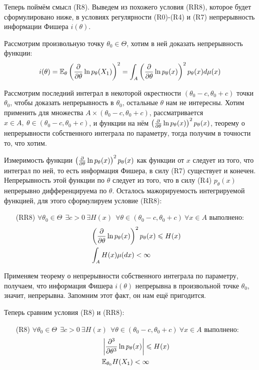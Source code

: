 \begin{note}
    Теперь поймём смысл (R8). Выведем из похожего условия (RR8), которое будет сформулировано ниже, в условиях регулярности (R0)-(R4) и (R7) непрерывность информации Фишера $i(\theta)$.
    
    Рассмотрим произвольную точку $\theta_0 \in \Theta$, хотим в ней доказать непрерывность функции:
    \[
        i(\theta) = \mathbb{E}_\theta \left(\frac{\partial}{\partial \theta} \ln p_\theta(X_1)\right)^2 = \int_A \left(\frac{\partial}{\partial \theta} \ln p_\theta(x)\right)^2 p_\theta(x) d\mu(x)
    \]

    Рассмотрим последний интеграл в некоторой окрестности $(\theta_0 - c, \theta_0 + c)$ точки $\theta_0$, чтобы доказать непрерывность в $\theta_0$, остальные $\theta$ нам не интересны. Хотим применить для множества $A \times (\theta_0 - c, \theta_0 + c)$, рассматривается $x \in A,\ \theta \in (\theta_0 - c, \theta_0 + c)$, и функции на нём $\left(\frac{\partial}{\partial \theta} \ln p_\theta(x)\right)^2 p_\theta(x)$, теорему о непрерывности собственного интеграла по параметру, тогда получим в точности то, что хотим.

    Измеримость функции $\left(\frac{\partial}{\partial \theta} \ln p_\theta(x)\right)^2 p_\theta(x)$ как функции от $x$ следует из того, что интеграл по ней, то есть информация Фишера, в силу (R7) существует и конечен. Непрерывность этой функции по $\theta$ следует из того, что в силу (R4) $p_\theta(x)$ непрерывно дифференцируема по $\theta$. Осталось мажорируемость интегрируемой функцией, для этого сформулируем условие (RR8):
    \begin{itemize}
        \item[(RR8)] $\forall \theta_0 \in \Theta \ \ \exists c > 0 \ \exists H(x) \ \ \forall \theta \in (\theta_0 - c, \theta_0 + c) \ \forall x \in A$ выполнено:
        \begin{align*}
            & \left(\frac{\partial}{\partial \theta} \ln p_\theta(x)\right)^2 p_\theta(x) \leqslant H(x)
            \\
            & \int_A H(x) \mu(dx) < \infty
        \end{align*}
    \end{itemize}

    Применяем теорему о непрерывности собственного интеграла по параметру, получаем, что информация Фишера $i(\theta)$ непрерывна в произвольной точке $\theta_0$, значит, непрерывна. Запомним этот факт, он нам ещё пригодится.

    Теперь сравним условия (R8) и (RR8):
    \begin{itemize}
        \item[(R8)] $\forall \theta_0 \in \Theta \ \ \exists c > 0 \ \exists H(x) \ \ \forall \theta \in (\theta_0 - c, \theta_0 + c) \ \forall x \in A$ выполнено:
        \begin{align*}
            & \left|\frac{\partial^3}{\partial \theta^3} \ln p_\theta(x)\right| \leqslant H(x)
            \\
            & \mathbb{E}_{\theta_0} H(X_1) < \infty
        \end{align*}


\end{itemize}
\end{note}
